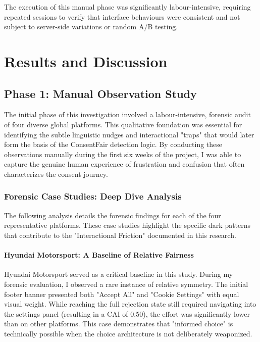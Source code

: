 \documentclass[12pt,a4paper]{report}
\begin{document}
The execution of this manual phase was significantly labour-intensive, requiring repeated sessions to verify that interface behaviours were consistent and not subject to server-side variations or random A/B testing.

\newpage

\chapter{Results and Discussion}

\section{Phase 1: Manual Observation Study}

The initial phase of this investigation involved a labour-intensive, forensic audit of four diverse global platforms. This qualitative foundation was essential for identifying the subtle linguistic nudges and interactional "traps" that would later form the basis of the ConsentFair detection logic. By conducting these observations manually during the first six weeks of the project, I was able to capture the genuine human experience of frustration and confusion that often characterizes the consent journey.

\subsection{Forensic Case Studies: Deep Dive Analysis}

The following analysis details the forensic findings for each of the four representative platforms. These case studies highlight the specific dark patterns that contribute to the "Interactional Friction" documented in this research.

\subsubsection{Hyundai Motorsport: A Baseline of Relative Fairness}
Hyundai Motorsport served as a critical baseline in this study. During my forensic evaluation, I observed a rare instance of relative symmetry. The initial footer banner presented both "Accept All" and "Cookie Settings" with equal visual weight. While reaching the full rejection state still required navigating into the settings panel (resulting in a CAI of 0.50), the effort was significantly lower than on other platforms. This case demonstrates that "informed choice" is technically possible when the choice architecture is not deliberately weaponized.
\end{document}
